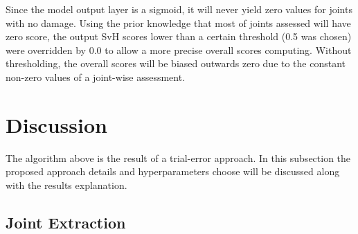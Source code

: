 \documentclass[thesis=B,english]{FITthesis}[2019/12/23]
\begin{document}
Since the model output layer is a sigmoid, it will never yield zero values for joints with no damage. Using the prior knowledge that most of joints assessed will have zero score, the output SvH scores lower than a certain threshold (0.5 was chosen) were overridden by 0.0 to allow a more precise overall scores computing. Without thresholding, the overall scores will be biased outwards zero due to the constant non-zero values of a joint-wise assessment.

\section{Discussion}

The algorithm above is the result of a trial-error approach. In this subsection the proposed approach details and hyperparameters choose will be discussed along with the results explanation.

\subsection{Joint Extraction}
\end{document}
